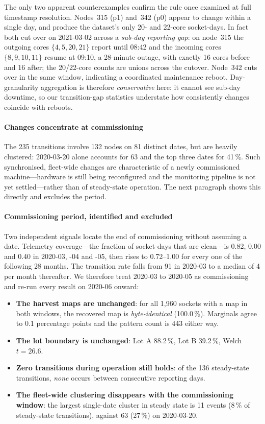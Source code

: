 \documentclass[10pt,conference]{IEEEtran}
\begin{document}
The only two apparent counterexamples confirm the rule once examined at full timestamp resolution.
Nodes~315 (p1) and~342 (p0) appear to change within a single day, and produce the dataset's only
20- and 22-core socket-days. In fact both cut over on 2021-03-02 across a \emph{sub-day reporting
gap}: on node~315 the outgoing cores $\{4,5,20,21\}$ report until 08:42 and the incoming cores
$\{8,9,10,11\}$ resume at 09:10, a 28-minute outage, with exactly 16 cores before and 16 after; the
20/22-core counts are unions across the cutover. Node~342 cuts over in the same window, indicating
a coordinated maintenance reboot. Day-granularity aggregation is therefore \emph{conservative}
here: it cannot see sub-day downtime, so our transition-gap statistics understate how consistently
changes coincide with reboots.

\paragraph{Changes concentrate at commissioning} The 235 transitions involve 132 nodes on 81
distinct dates, but are heavily clustered: 2020-03-20 alone accounts for 63 and the top three dates
for 41\,\%. Such synchronised, fleet-wide changes are characteristic of a newly commissioned
machine---hardware is still being reconfigured and the monitoring pipeline is not yet
settled---rather than of steady-state operation. The next paragraph shows this directly and
excludes the period.

\paragraph{Commissioning period, identified and excluded}
\label{par:commissioning}
Two independent signals locate the end of commissioning without assuming a date. Telemetry
coverage---the fraction of socket-days that are clean---is 0.82, 0.00 and 0.40 in 2020-03, -04 and
-05, then rises to 0.72--1.00 for every one of the following 28 months. The transition rate falls
from 91 in 2020-03 to a median of 4 per month thereafter. We therefore treat 2020-03 to 2020-05 as
commissioning and re-run every result on 2020-06 onward:

\begin{itemize}\itemsep1pt
\item \textbf{The harvest maps are unchanged}: for all 1{,}960 sockets with a map in both windows,
      the recovered map is \emph{byte-identical} (100.0\,\%). Marginals agree to 0.1 percentage
      points and the pattern count is 443 either way.
\item \textbf{The lot boundary is unchanged}: Lot A 88.2\,\%, Lot B 39.2\,\%, Welch $t=26.6$.
\item \textbf{Zero transitions during operation still holds}: of the 136 steady-state transitions,
      \emph{none} occurs between consecutive reporting days.
\item \textbf{The fleet-wide clustering disappears with the commissioning window}: the largest
      single-date cluster in steady state is 11 events (8\,\% of steady-state transitions), against
      63 (27\,\%) on 2020-03-20.
\end{itemize}
\end{document}

